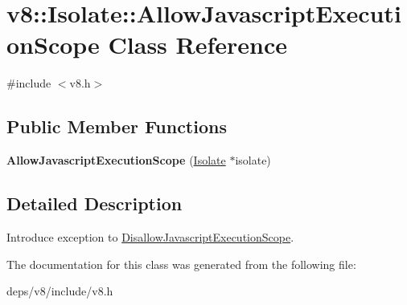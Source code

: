 \hypertarget{classv8_1_1_isolate_1_1_allow_javascript_execution_scope}{}\section{v8\+:\+:Isolate\+:\+:Allow\+Javascript\+Execution\+Scope Class Reference}
\label{classv8_1_1_isolate_1_1_allow_javascript_execution_scope}


{\ttfamily \#include $<$v8.\+h$>$}

\subsection*{Public Member Functions}
\begin{DoxyCompactItemize}
\item 
\hypertarget{classv8_1_1_isolate_1_1_allow_javascript_execution_scope_ac73a647c33756c6b7c3896170e069e8c}{}{\bfseries Allow\+Javascript\+Execution\+Scope} (\hyperlink{classv8_1_1_isolate}{Isolate} $\ast$isolate)\label{classv8_1_1_isolate_1_1_allow_javascript_execution_scope_ac73a647c33756c6b7c3896170e069e8c}

\end{DoxyCompactItemize}


\subsection{Detailed Description}
Introduce exception to \hyperlink{classv8_1_1_isolate_1_1_disallow_javascript_execution_scope}{Disallow\+Javascript\+Execution\+Scope}. 

The documentation for this class was generated from the following file\+:\begin{DoxyCompactItemize}
\item 
deps/v8/include/v8.\+h\end{DoxyCompactItemize}
